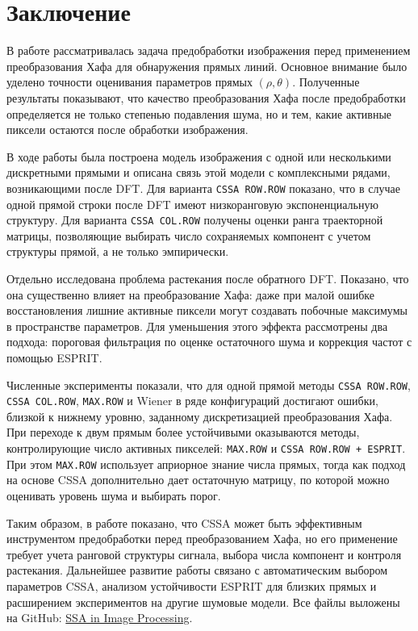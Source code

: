 \chapter*{Заключение}
\enlargethispage{2\baselineskip}

В работе рассматривалась задача предобработки изображения перед применением
преобразования Хафа для обнаружения прямых линий. Основное внимание было
уделено точности оценивания параметров прямых $(\rho,\theta)$. Полученные
результаты показывают, что качество преобразования Хафа после предобработки
определяется не только степенью подавления шума, но и тем, какие активные
пиксели остаются после обработки изображения.

В ходе работы была построена модель изображения с одной или несколькими
дискретными прямыми и описана связь этой модели с комплексными рядами,
возникающими после DFT. Для варианта \texttt{CSSA ROW.ROW} показано, что в
случае одной прямой строки после DFT имеют низкоранговую экспоненциальную
структуру. Для варианта \texttt{CSSA COL.ROW} получены оценки ранга траекторной
матрицы, позволяющие выбирать число сохраняемых компонент с учетом структуры
прямой, а не только эмпирически.

Отдельно исследована проблема растекания после обратного DFT. Показано, что
она существенно влияет на преобразование Хафа: даже при малой ошибке
восстановления лишние активные пиксели могут создавать побочные максимумы в
пространстве параметров. Для уменьшения этого эффекта рассмотрены два подхода:
пороговая фильтрация по оценке остаточного шума и коррекция частот с помощью
ESPRIT.

Численные эксперименты показали, что для одной прямой методы
\texttt{CSSA ROW.ROW}, \texttt{CSSA COL.ROW}, \texttt{MAX.ROW} и Wiener в
ряде конфигураций достигают ошибки, близкой к нижнему уровню, заданному
дискретизацией преобразования Хафа. При переходе к двум прямым более устойчивыми
оказываются методы, контролирующие число активных пикселей: \texttt{MAX.ROW}
и \texttt{CSSA ROW.ROW + ESPRIT}. При этом \texttt{MAX.ROW} использует
априорное знание числа прямых, тогда как подход на основе CSSA дополнительно дает
остаточную матрицу, по которой можно оценивать уровень шума и выбирать порог.

Таким образом, в работе показано, что CSSA может быть эффективным инструментом
предобработки перед преобразованием Хафа, но его применение требует учета
ранговой структуры сигнала, выбора числа компонент и контроля растекания.
Дальнейшее развитие работы связано с автоматическим выбором параметров CSSA,
анализом устойчивости ESPRIT для близких прямых и расширением экспериментов на
другие шумовые модели. Все файлы выложены на GitHub:
\href{https://github.com/Programmer-Alexey/SSA-in-Image-processing}{SSA in
Image Processing}.
